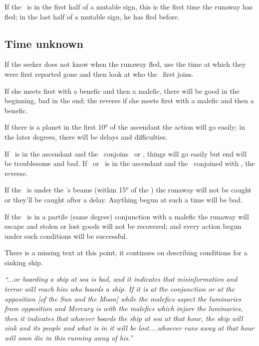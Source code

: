 If the \Moon\, is in the first half of a mutable sign, this is the first time the runaway has fled; in the last half of a mutable sign, he has fled before.

\subsection{Time unknown}
If the seeker does not know when the runaway fled, use the time at which they were first reported gone and then look at who the \Moon\, first joins.

If she meets first with a benefic and then a malefic, there will be good in the beginning, bad in the end; the reverse if she meets first with a malefic and then a benefic.

If there is a planet in the first 10° of the ascendant the action will go easily; in the later degrees, there will be delays and difficulties.

If \Jupiter\, is in the ascendant and the \Moon\, conjoins \Saturn\, or \Mars, things will go easily but end will be troublesome and bad. If \Saturn\, or \Mars\, is in the ascendant and the \Moon\, conjoined with \Jupiter, the reverse.

If the \Moon\, is under the \Sun's beams (within 15° of the \Sun) the runaway will not be caught or they'll be caught after a delay. Anything begun at such a time will be bad.

If the \Moon\, is in a partile (same degree) conjunction with a malefic the runaway will escape and stolen or lost goods will not be recovered; and every action begun under such conditions will be successful.

\begin{mdframed}[backgroundcolor=cyan!5, rightmargin=1em, leftmargin=1em]
There is a missing text at this point, it continues on describing conditions for a sinking ship.
\end{mdframed}

\textsl{``...or boarding a ship at sea is bad, and it indicates that misinformation and terror will reach him who boards a ship. If it is at the conjunction or at the opposition [of the Sun and the Moon] while the malefics aspect the luminaries from opposition and Mercury is with the malefics which injure the luminaries, then it indicates that whoever boards the ship at sea at that hour, the ship will sink and its people and what is in it will be lost....whoever runs away at that hour will soon die in this running away of his.''}

